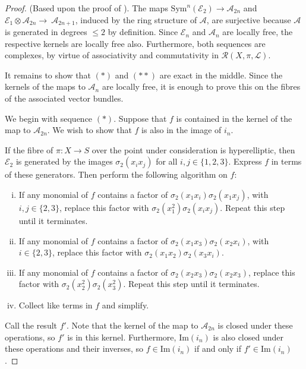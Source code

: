 \documentclass{amsart}
\begin{document}
\begin{proof} (Based upon the proof of \cite[Lemma 4.4]{flgi}). The maps ${\mathrm{Sym}}^n({\mathcal{E}}_2) \to {\mathcal{A}}_{2n}$ and ${\mathcal{E}}_1 \otimes {\mathcal{A}}_{2n} \to~{\mathcal{A}}_{2n+1}$, induced by the ring structure of ${\mathcal{A}}$, are surjective because ${\mathcal{A}}$ is generated in degrees $\leq 2$ by definition. Since ${\mathcal{E}}_n$ and ${\mathcal{A}}_n$ are locally free, the respective kernels are locally free also. Furthermore, both sequences are complexes, by virtue of associativity and commutativity in ${\mathcal{R}}(X,\pi,{\mathcal{L}})$.

It remains to show that $(*)$ and $(**)$ are exact in the middle. Since the kernels of the maps to ${\mathcal{A}}_n$ are locally free, it is enough to prove this on the fibres of the associated vector bundles.  

We begin with sequence $(*)$. Suppose that $f$ is contained in the kernel of the map to ${\mathcal{A}}_{2n}$. We wish to show that $f$ is also in the image of $i_n$.

If the fibre of $\pi\colon X \to S$ over the point under consideration is hyperelliptic, then ${\mathcal{E}}_2$ is generated by the images $\sigma_2(x_ix_j)$ for all $i,j \in \{1,2,3\}$. Express $f$ in terms of these generators. Then perform the following algorithm on $f$:
\begin{enumerate}[(i)]
\item If any monomial of $f$ contains a factor of $\sigma_2(x_1x_i)\sigma_2(x_1x_j)$, with $i,j \in \{2,3\}$, replace this factor with $\sigma_2(x_1^2)\sigma_2(x_ix_j)$. Repeat this step until it terminates.
\item If any monomial of $f$ contains a factor of $\sigma_2(x_1x_3)\sigma_2(x_2x_i)$, with $i \in \{2,3\}$, replace this factor with $\sigma_2(x_1x_2)\sigma_2(x_3x_i)$.
\item If any monomial of $f$ contains a factor of $\sigma_2(x_2x_3)\sigma_2(x_2x_3)$, replace this factor with $\sigma_2(x_2^2)\sigma_2(x_3^2)$. Repeat this step until it terminates.
\item Collect like terms in $f$ and simplify.
\end{enumerate}
Call the result $f'$. Note that the kernel of the map to ${\mathcal{A}}_{2n}$ is closed under these operations, so $f'$ is in this kernel. Furthermore, $\mathrm{Im}(i_n)$ is also closed under these operations and their inverses, so $f \in \mathrm{Im}(i_n)$ if and only if $f' \in \mathrm{Im}(i_n)$.


\end{proof}
\end{document}
